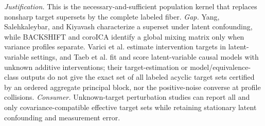 \documentclass{article}
\begin{document}
\par\smallskip\noindent \textit{Justification.} This is the necessary-and-sufficient population kernel that replaces nonsharp target supersets by the complete labeled fiber. \textit{Gap.} Yang, Salehkaleybar, and Kiyavash characterize a superset under latent confounding, while BACKSHIFT and coroICA identify a global mixing matrix only when variance profiles separate.  Varici et al. estimate intervention targets in latent-variable settings, and Taeb et al. fit and score latent-variable causal models with unknown additive interventions; their target-estimation or model/equivalence-class outputs do not give the exact set of all labeled acyclic target sets certified by an ordered aggregate principal block, nor the positive-noise converse at profile collisions. \textit{Consumer.} Unknown-target perturbation studies can report all and only covariance-compatible effective target sets while retaining stationary latent confounding and measurement error.
\end{document}
